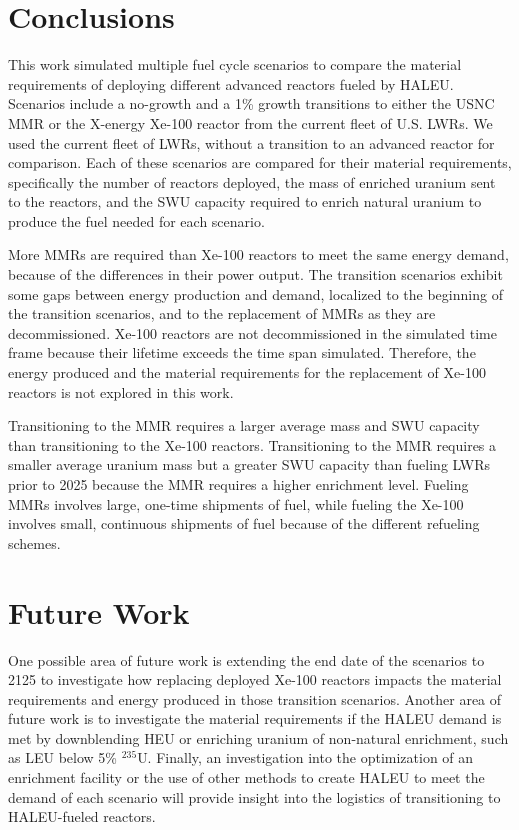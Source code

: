 \section{Conclusions}
This work simulated multiple fuel cycle scenarios to compare the 
material requirements of deploying different advanced reactors fueled 
by \gls{HALEU}. Scenarios include a no-growth and a 1\% growth 
transitions to either the \gls{USNC} \gls{MMR} or the X-energy Xe-100 
reactor from the current fleet of U.S. \glspl{LWR}. We used the current 
fleet of \glspl{LWR}, without a transition to an advanced reactor for 
comparison. Each of these scenarios are compared for their material 
requirements, specifically the number of reactors deployed, the mass 
of enriched uranium sent to the reactors, and the \gls{SWU} capacity 
required to enrich natural uranium to produce the fuel needed for 
each scenario. 

More \glspl{MMR} are required than Xe-100 reactors to meet the same 
energy demand, because of the differences in their power output. 
The transition scenarios exhibit some gaps between  
energy production and demand, localized to the beginning of the 
transition
scenarios, and to the replacement of \glspl{MMR} as they are decommissioned. 
Xe-100 reactors are not decommissioned in the simulated time frame because 
their lifetime exceeds the time span simulated. Therefore, the 
energy produced and the material requirements for the replacement of 
Xe-100 reactors is not explored in this work. 

Transitioning to the \gls{MMR} requires 
a larger average mass and \gls{SWU} capacity than transitioning to the 
Xe-100 reactors. Transitioning to the \gls{MMR} requires a smaller average 
uranium mass but a greater \gls{SWU} capacity than fueling \glspl{LWR} prior 
to 2025 because the \gls{MMR} requires a higher enrichment level. 
Fueling \glspl{MMR} involves large, one-time shipments of fuel, while 
fueling the Xe-100 involves small, continuous shipments of fuel 
because of the different refueling schemes.

\section{Future Work}
One possible area of future work is extending the end date 
of the scenarios to 2125 to investigate how replacing deployed Xe-100 
reactors impacts the material requirements and energy produced in those 
transition scenarios. Another area of future work is to investigate the 
material requirements if the \gls{HALEU} demand is met by downblending 
\gls{HEU} or enriching uranium of non-natural enrichment, such as 
\gls{LEU} below 5\% $^{235}$U. Finally, an investigation into the 
optimization of an enrichment facility or the use of other methods to 
create \gls{HALEU} to meet the demand of each scenario will provide 
insight into the logistics of transitioning to \gls{HALEU}-fueled 
reactors. 
